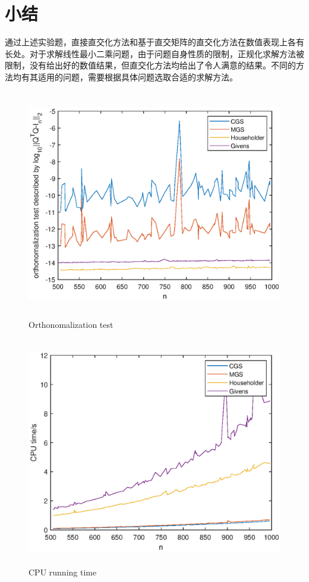 \documentclass[UTF8,a4paper,10pt]{ctexart}
\begin{document}
\section{小结}
    \par
    通过上述实验题，直接直交化方法和基于直交矩阵的直交化方法在数值表现上各有长处。对于求解线性最小二乘问题，由于问题自身性质的限制，正规化求解方法被限制，没有给出好的数值结果，但直交化方法均给出了令人满意的结果。不同的方法均有其适用的问题，需要根据具体问题选取合适的求解方法。

    \begin{figure}[ht]
        \centering
        \includegraphics[width=14cm,height=10cm]{1_orthonomalization.eps}
        \caption{Orthonomalization test}
    \end{figure}
    \begin{figure}[ht]
        \centering
        \includegraphics[width=14cm,height=10cm]{1_CPU.eps}
        \caption{CPU running time}
    \end{figure}
\end{document}
